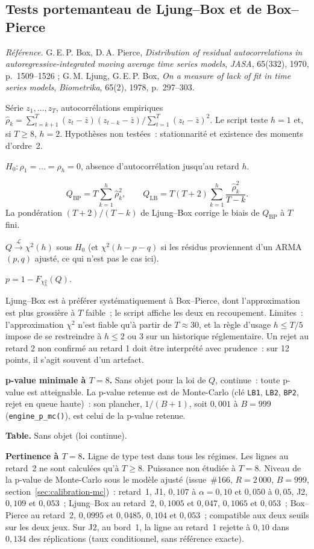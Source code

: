 \documentclass[a4paper,11pt]{article}
\newcommand{\code}[1]{\texttt{\small #1}}
\newcommand{\refl}[1]{{\small\textcolor{maincolor!70!black}{\textit{Référence.} #1}}\par\smallskip}
\newcounter{ficheid}
\newenvironment{fiche}[1]{%
  \stepcounter{ficheid}%
  \phantomsection
  \subsection{#1}%
  \label{fiche:\theficheid}%
}{%
  \end{description}\vspace{0.5em}%
}
\newcommand{\Cadre}{%
  \begin{description}[leftmargin=0pt, style=unboxed, itemsep=3pt, topsep=3pt, parsep=2pt]%
  \item[\textcolor{financeblue}{\textbf{1. Cadre, notations et hypothèses de validité (non testées).}}]}
\newcommand{\Hzero}{\item[\textcolor{financeblue}{\textbf{2. Hypothèse nulle.}}]}
\newcommand{\Stat}{\item[\textcolor{financeblue}{\textbf{3. Statistique de test.}}]}
\newcommand{\Loi}{\item[\textcolor{financeblue}{\textbf{4. Loi sous $H_0$.}}]}
\newcommand{\Pval}{\item[\textcolor{financeblue}{\textbf{5. p-value.}}]}
\newcommand{\Usage}{\item[\textcolor{financeblue}{\textbf{6. Usage et limites.}}]}
\newcommand{\Pertinence}{\item[\textcolor{financeblue}{\textbf{7. Pertinence et puissance à faible $T$.}}]}
\begin{document}
\begin{fiche}{Tests portemanteau de Ljung--Box et de Box--Pierce}
\label{fiche:ljung-box}%
\refl{G.\,E.\,P. Box, D.\,A. Pierce, \emph{Distribution of residual autocorrelations in
autoregressive-integrated moving average time series models}, \emph{JASA}, 65(332), 1970,
p.~1509--1526 ; G.\,M. Ljung, G.\,E.\,P. Box, \emph{On a measure of lack of fit in time series
models}, \emph{Biometrika}, 65(2), 1978, p.~297--303.}
\Cadre
Série $z_1,\dots,z_T$, autocorrélations empiriques
$\hat\rho_k = \sum_{t=k+1}^{T}(z_t-\bar z)(z_{t-k}-\bar z)\big/\sum_{t=1}^{T}(z_t-\bar z)^2$.
Le script teste $h = 1$ et, si $T \ge 8$, $h = 2$. Hypothèses non testées~: stationnarité et
existence des moments d'ordre~2.
\Hzero
$H_0 : \rho_1 = \dots = \rho_h = 0$, absence d'autocorrélation jusqu'au retard $h$.
\Stat
\[
  Q_{\mathrm{BP}} = T\sum_{k=1}^{h}\hat\rho_k^2 ,
  \qquad
  Q_{\mathrm{LB}} = T(T+2)\sum_{k=1}^{h}\frac{\hat\rho_k^2}{T-k}.
\]
La pondération $(T+2)/(T-k)$ de Ljung--Box corrige le biais de $Q_{\mathrm{BP}}$ à $T$ fini.
\Loi
$Q \xrightarrow{\ \mathcal{L}\ } \chi^2(h)$ sous $H_0$ (et $\chi^2(h-p-q)$ si les résidus
proviennent d'un ARMA$(p,q)$ ajusté, ce qui n'est pas le cas ici).
\Pval
$p = 1 - F_{\chi^2_h}(Q)$.
\Usage
Ljung--Box est à préférer systématiquement à Box--Pierce, dont l'approximation est plus grossière
à $T$ faible~; le script affiche les deux en recoupement. Limites~: l'approximation $\chi^2$ n'est
fiable qu'à partir de $T \approx 30$, et la règle d'usage $h \le T/5$ impose de se restreindre à
$h \le 2$ ou $3$ sur un historique réglementaire. Un rejet au retard 2 non confirmé au retard 1
doit être interprété avec prudence~: sur 12 points, il s'agit souvent d'un artefact.
\Pertinence
\textbf{p-value minimale à $T = 8$.} Sans objet pour la loi de $Q$, continue~: toute p-value est atteignable. La p-value retenue est de Monte-Carlo (clé \code{LB1}, \code{LB2}, \code{BP2}, rejet en queue haute)~: son plancher, $1/(B+1)$, soit $0{,}001$ à $B = 999$ (\code{engine\_p\_mc()}), est celui de la p-value retenue.

\textbf{Table.} Sans objet (loi continue).

\textbf{Pertinence à $T = 8$.} Ligne de type test dans tous les régimes. Les lignes au retard~2 ne sont calculées qu'à $T \ge 8$. Puissance non étudiée à $T = 8$. Niveau de la p-value de Monte-Carlo sous le modèle ajusté (issue~\#166, $R = 2\,000$, $B = 999$, section~\ref{sec:calibration-mc})~: retard~1, J1, $0{,}107$ à $\alpha = 0{,}10$ et $0{,}050$ à $0{,}05$, J2, $0{,}109$ et $0{,}053$~; Ljung--Box au retard~2, $0{,}1005$ et $0{,}047$, $0{,}1065$ et $0{,}053$~; Box--Pierce au retard~2, $0{,}0995$ et $0{,}0485$, $0{,}104$ et $0{,}053$~; compatible aux deux seuils sur les deux jeux. Sur J2, au bord~1, la ligne au retard~1 rejette à $0{,}10$ dans $0{,}134$ des réplications (taux conditionnel, sans référence exacte).


\end{fiche}
\end{document}
